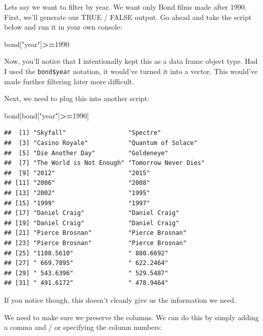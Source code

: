 \documentclass[
]{book}
\newenvironment{Shaded}{\begin{snugshade}}{\end{snugshade}}
\newcommand{\DecValTok}[1]{\textcolor[rgb]{0.00,0.00,0.81}{#1}}
\newcommand{\NormalTok}[1]{#1}
\newcommand{\OperatorTok}[1]{\textcolor[rgb]{0.81,0.36,0.00}{\textbf{#1}}}
\newcommand{\StringTok}[1]{\textcolor[rgb]{0.31,0.60,0.02}{#1}}
\begin{document}
\begin{center}
Lets say we want to filter by year. We want only Bond films made after 1990. First, we'll generate our TRUE / FALSE output. Go ahead and take the script below and run it in your own console:

\begin{Shaded}
\begin{Highlighting}[]
\NormalTok{bond[}\StringTok{"year"}\NormalTok{]}\OperatorTok{>=}\DecValTok{1990}
\end{Highlighting}
\end{Shaded}

Now, you'll notice that I intentionally kept this as a data frame object type. Had I used the \texttt{bond\$year} notation, it would've turned it into a vector. This would've made further filtering later more difficult.

Next, we need to plug this into another script:

\begin{Shaded}
\begin{Highlighting}[]
\NormalTok{bond[bond[}\StringTok{"year"}\NormalTok{]}\OperatorTok{>=}\DecValTok{1990}\NormalTok{]}
\end{Highlighting}
\end{Shaded}

\begin{verbatim}
##  [1] "Skyfall"                 "Spectre"                
##  [3] "Casino Royale"           "Quantum of Solace"      
##  [5] "Die Another Day"         "Goldeneye"              
##  [7] "The World is Not Enough" "Tomorrow Never Dies"    
##  [9] "2012"                    "2015"                   
## [11] "2006"                    "2008"                   
## [13] "2002"                    "1995"                   
## [15] "1999"                    "1997"                   
## [17] "Daniel Craig"            "Daniel Craig"           
## [19] "Daniel Craig"            "Daniel Craig"           
## [21] "Pierce Brosnan"          "Pierce Brosnan"         
## [23] "Pierce Brosnan"          "Pierce Brosnan"         
## [25] "1108.5610"               " 880.6692"              
## [27] " 669.7895"               " 622.2464"              
## [29] " 543.6396"               " 529.5487"              
## [31] " 491.6172"               " 478.9464"
\end{verbatim}

If you notice though, this doesn't cleanly give us the information we need.

We need to make sure we preserve the columns. We can do this by simply adding a comma and / or specifying the column numbers:


\end{center}
\end{document}
